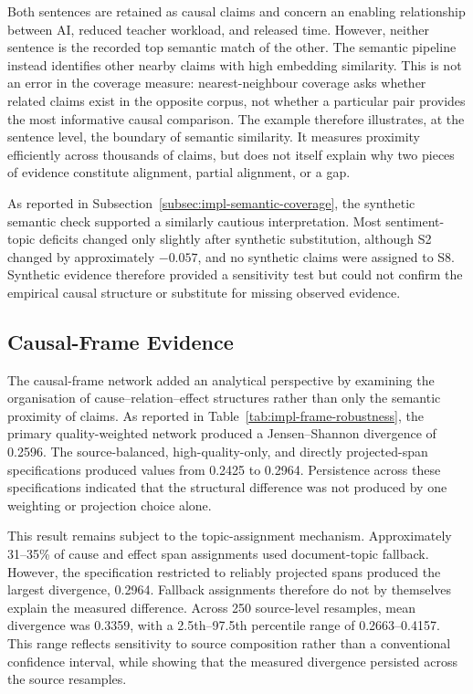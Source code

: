 Both sentences are retained as causal claims and concern an enabling relationship
between AI, reduced teacher workload, and released time. However, neither sentence is
the recorded top semantic match of the other. The semantic pipeline instead
identifies other nearby claims with high embedding similarity. This is not an error
in the coverage measure: nearest-neighbour coverage asks whether related claims exist
in the opposite corpus, not whether a particular pair provides the most informative
causal comparison. The example therefore illustrates, at the sentence level, the
boundary of semantic similarity. It measures proximity efficiently across thousands
of claims, but does not itself explain why two pieces of evidence constitute
alignment, partial alignment, or a gap.

As reported in Subsection~\ref{subsec:impl-semantic-coverage}, the synthetic semantic
check supported a similarly cautious interpretation. Most sentiment-topic deficits
changed only slightly after synthetic substitution, although S2 changed by
approximately \(-0.057\), and no synthetic claims were assigned to S8. Synthetic
evidence therefore provided a sensitivity test but could not confirm the empirical
causal structure or substitute for missing observed evidence.

\subsection{Causal-Frame Evidence}
\label{subsec:analysis-causal-frame}

The causal-frame network added an analytical perspective by examining the
organisation of cause--relation--effect structures rather than only the
semantic proximity of claims. As reported in
Table~\ref{tab:impl-frame-robustness}, the primary quality-weighted network produced
a Jensen--Shannon divergence of 0.2596. The source-balanced, high-quality-only, and
directly projected-span specifications produced values from 0.2425 to 0.2964.
Persistence across these specifications indicated that the structural
difference was not produced by one weighting or projection choice alone.

This result remains subject to the topic-assignment mechanism. Approximately
31--35\% of cause and effect span assignments used document-topic fallback.
However, the specification restricted to reliably projected spans produced the
largest divergence, 0.2964. Fallback assignments therefore do not by themselves
explain the measured difference. Across 250 source-level resamples, mean divergence
was 0.3359, with a 2.5th--97.5th percentile range of 0.2663--0.4157. This range
reflects sensitivity to source composition rather than a conventional confidence
interval, while showing that the measured divergence persisted across the source
resamples.

